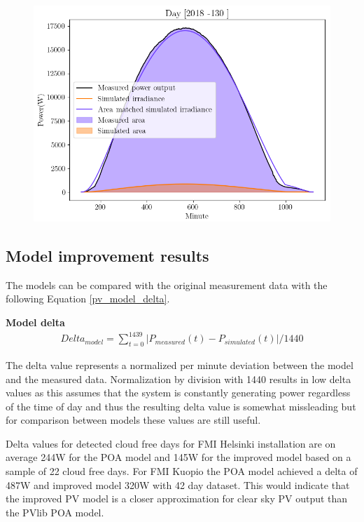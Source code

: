 

\begin{figure}[h]
\centering
\includegraphics[width=0.7\linewidth]{pics/areamatching2}
\label{fig_area_match}
\end{figure}

\newpage
\subsection{Model improvement results}
The models can be compared with the original measurement data with the following Equation \ref{pv_model_delta}.



\noindent\textbf{Model delta}
\begin{equation}
\begin{split}
\label{pv_model_delta}
Delta_{model} = \sum_{t=0}^{1439} |P_{measured}(t) - P_{simulated}(t)| /1440
\end{split}
\end{equation}

\noindent The delta value represents a normalized per minute deviation between the model and the measured data. Normalization by division with 1440 results in low delta values as this assumes that the system is constantly generating power regardless of the time of day and thus the resulting delta value is somewhat missleading but for comparison between models these values are still useful.


Delta values for detected cloud free days for FMI Helsinki installation are on average 244W for the POA model and 145W for the improved model based on a sample of 22 cloud free days. For FMI Kuopio the POA model achieved a delta of 487W and improved model 320W with 42 day dataset. This would indicate that the improved PV model is a closer approximation for clear sky PV output than the PVlib POA model.


